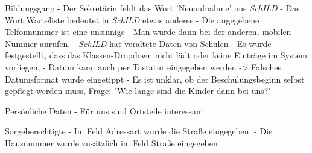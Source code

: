 Bildungsgang
- Der Sekretärin fehlt das Wort 'Neuaufnahme' aus  \textit{SchILD} 
- Das Wort Warteliste bedeutet in \textit{SchILD} etwas anderes
- Die angegebene Telfonnummer ist eine unsinnige - Man würde dann bei der anderen, mobilen Nummer anrufen.
- \textit{SchILD} hat veraltete Daten von Schulen
- Es wurde festgestellt, dass das Klassen-Dropdown nicht lädt oder keine Einträge im System vorliegen, 
- Datum kann auch per Tastatur eingegeben werden -> Falsches Datumsformat wurde eingetippt
- Es ist unklar, ob der Beschulungsbeginn selbst gepflegt werden muss, Frage: "Wie lange sind die Kinder dann bei uns?"















































Persönliche Daten										
- Für uns sind Ortsteile interessant





















Sorgeberechtigte
- Im Feld Adressart wurde die Straße eingegeben.
- Die Hausnummer wurde zusätzlich im Feld Straße eingegeben




































